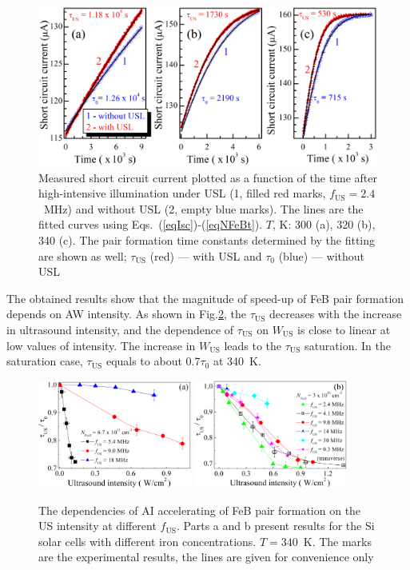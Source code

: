 \documentclass[sn-mathphys]{sn-jnl}%
\theoremstyle{thmstyleone}%
\theoremstyle{thmstyletwo}%
\theoremstyle{thmstylethree}%
\begin{document}
\begin{figure}
\centering
 \includegraphics[width=1.0\textwidth]{Fig3}
\caption{
Measured short circuit current plotted as a function of the time after high-intensive illumination
under USL (1, filled red marks, $f_\mathrm{US} = 2.4$~MHz) and without USL (2, empty blue marks).
The lines are the fitted curves using Eqs.~(\ref{eqIsc})-(\ref{eqNFeBt}).
$T$, K: 300 (a), 320 (b), 340 (c).
The pair formation time constants determined by the fitting are shown as well;
$\tau_\mathrm{US}$ (red) --- with USL and $\tau_{0}$ (blue) --- without USL
}
\label{figIscUs}       %
\end{figure}

The obtained results show that the magnitude of speed-up of FeB pair
formation depends on AW intensity.
As shown in Fig.\ref{figfus}, the $\tau_\mathrm{US}$ decreases with the
increase in ultrasound intensity, and the dependence of $\tau_\mathrm{US}$ on
$W_\mathrm{US}$ is close to linear  at low values of intensity.
The increase in $W_\mathrm{US}$ leads to the $\tau_\mathrm{US}$ saturation.
In the saturation case, $\tau_\mathrm{US}$ equals to about 0.7$\tau_{0}$ at 340~K.


\begin{figure}
\centering
 \includegraphics[width=0.45\textwidth]{Fig4a}
 \includegraphics[width=0.45\textwidth]{Fig4b}
\caption{
The dependencies of AI accelerating of FeB pair formation on the US intensity at different $f_\mathrm{US}$.
Parts a and b present results for the Si solar cells with different iron concentrations.
$T=340$~K.
The marks are the experimental results, the lines are given for convenience only
}
\label{figfus}       %
\end{figure}
\end{document}
